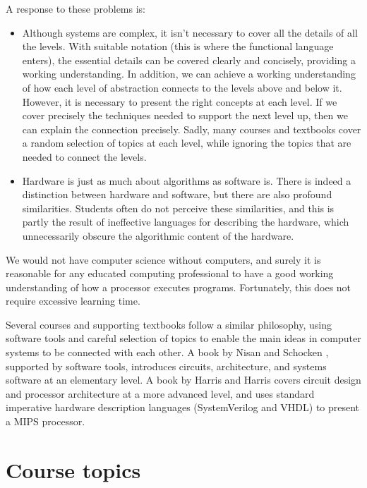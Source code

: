 \documentclass[submission,copyright,creativecommons]{eptcs}
\begin{document}
\noindent
A response to these problems is:

\begin{itemize}
\item Although systems are complex, it isn't necessary to cover all
  the details of all the levels.  With suitable notation (this is
  where the functional language enters), the essential details can be
  covered clearly and concisely, providing a working understanding.
  In addition, we can achieve a working understanding of how each
  level of abstraction connects to the levels above and below it.
  However, it is necessary to present the right concepts at each
  level.  If we cover precisely the techniques needed to support the
  next level up, then we can explain the connection precisely.  Sadly,
  many courses and textbooks cover a random selection of topics at
  each level, while ignoring the topics that are needed to connect the
  levels.
\item Hardware is just as much about algorithms as software is.  There
  is indeed a distinction between hardware and software, but there are
  also profound similarities.  Students often do not perceive these
  similarities, and this is partly the result of ineffective languages
  for describing the hardware, which unnecessarily obscure the
  algorithmic content of the hardware.
\end{itemize}

We would not have computer science without computers, and surely it
is reasonable for any educated computing professional to have a
good working understanding of how a processor executes programs.
Fortunately, this does not require excessive learning time.

Several courses and supporting textbooks follow a similar philosophy,
using software tools and careful selection of topics to enable the
main ideas in computer systems to be connected with each other.  A
book by Nisan and Schocken \cite{NisanSchocken2005:ElementsCompSys},
supported by software tools, introduces circuits, architecture, and
systems software at an elementary level.  A book by Harris and Harris
\cite{HH:DigDesignCompArch} covers circuit design and processor
architecture at a more advanced level, and uses standard imperative
hardware description languages (SystemVerilog and VHDL) to present a
MIPS processor.

\section{Course topics}
\label{sec:course-topics}
\end{document}
